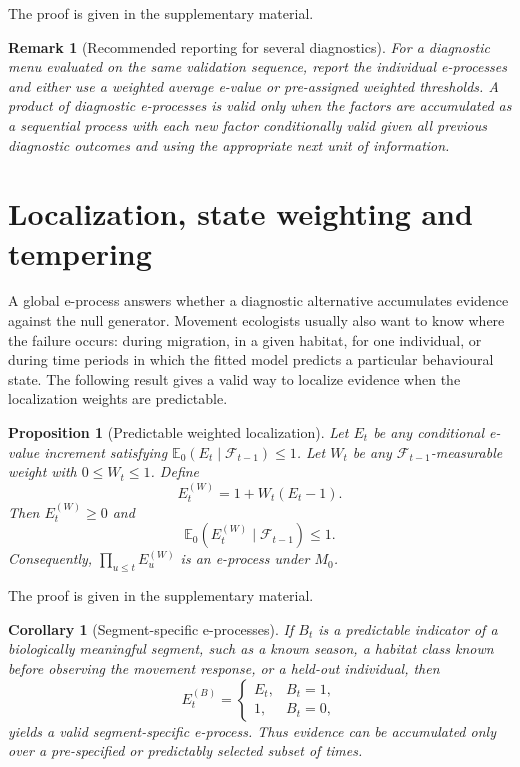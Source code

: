 \documentclass[pdflatex,sn-basic]{sn-jnl}
\theoremstyle{thmstyleone}
\newtheorem{proposition}[theorem]{Proposition}
\newtheorem{corollary}[theorem]{Corollary}
\theoremstyle{thmstyletwo}
\newtheorem{remark}{Remark}
\theoremstyle{thmstylethree}
\newcommand{\E}{\mathbb E}
\newcommand{\1}{\mathbf 1}
\newcommand{\calF}{\mathcal F}
\begin{document}
\noindent The proof is given in the supplementary material.

\begin{remark}[Recommended reporting for several diagnostics]
For a diagnostic menu evaluated on the same validation sequence, report the individual e-processes and either use a weighted average e-value or pre-assigned weighted thresholds. A product of diagnostic e-processes is valid only when the factors are accumulated as a sequential process with each new factor conditionally valid given all previous diagnostic outcomes and using the appropriate next unit of information.
\end{remark}

\section{Localization, state weighting and tempering}
\label{sec:localization}

A global e-process answers whether a diagnostic alternative accumulates evidence against the null generator. Movement ecologists usually also want to know where the failure occurs: during migration, in a given habitat, for one individual, or during time periods in which the fitted model predicts a particular behavioural state. The following result gives a valid way to localize evidence when the localization weights are predictable.

\begin{proposition}[Predictable weighted localization]
\label{prop:weighted_localization}
Let $E_t$ be any conditional e-value increment satisfying $\E_0(E_t\mid\calF_{t-1})\leq1$. Let $W_t$ be any $\calF_{t-1}$-measurable weight with $0\leq W_t\leq1$. Define
\begin{equation}
\label{eq:weighted_increment}
 E_t^{(W)}=1+W_t(E_t-1).
\end{equation}
Then $E_t^{(W)}\geq0$ and
\begin{equation}
 \E_0(E_t^{(W)}\mid\calF_{t-1})\leq1.
\end{equation}
Consequently, $\prod_{u\leq t}E_u^{(W)}$ is an e-process under $M_0$.
\end{proposition}

\noindent The proof is given in the supplementary material.

\begin{corollary}[Segment-specific e-processes]
\label{cor:segment}
If $B_t$ is a predictable indicator of a biologically meaningful segment, such as a known season, a habitat class known before observing the movement response, or a held-out individual, then
\begin{equation}
 E_t^{(B)}=\begin{cases}
 E_t, & B_t=1,\\
 1, & B_t=0,
 \end{cases}
\end{equation}
yields a valid segment-specific e-process. Thus evidence can be accumulated only over a pre-specified or predictably selected subset of times.
\end{corollary}
\end{document}
